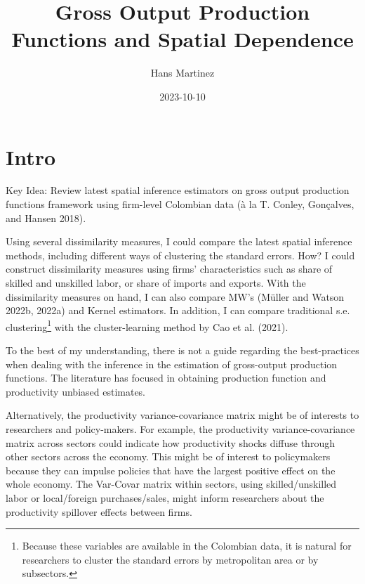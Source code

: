 \documentclass[
]{article}
\title{Gross Output Production Functions and Spatial Dependence}
\author{Hans Martinez}
\date{2023-10-10}
\begin{document}
\maketitle
\ifdefined\Shaded\renewenvironment{Shaded}{\begin{tcolorbox}[sharp corners, interior hidden, boxrule=0pt, enhanced, breakable, frame hidden, borderline west={3pt}{0pt}{shadecolor}]}{\end{tcolorbox}}\fi

\hypertarget{intro}{%
\section*{Intro}\label{intro}}

Key Idea: Review latest spatial inference estimators on gross output
production functions framework using firm-level Colombian data (à la T.
Conley, Gonçalves, and Hansen 2018).

Using several dissimilarity measures, I could compare the latest spatial
inference methods, including different ways of clustering the standard
errors. How? I could construct dissimilarity measures using firms'
characteristics such as share of skilled and unskilled labor, or share
of imports and exports. With the dissimilarity measures on hand, I can
also compare MW's (Müller and Watson 2022b, 2022a) and Kernel
estimators. In addition, I can compare traditional s.e.
clustering\footnote{Because these variables are available in the
  Colombian data, it is natural for researchers to cluster the standard
  errors by metropolitan area or by subsectors.} with the
cluster-learning method by Cao et al. (2021).

To the best of my understanding, there is not a guide regarding the
best-practices when dealing with the inference in the estimation of
gross-output production functions. The literature has focused in
obtaining production function and productivity unbiased estimates.

Alternatively, the productivity variance-covariance matrix might be of
interests to researchers and policy-makers. For example, the
productivity variance-covariance matrix across sectors could indicate
how productivity shocks diffuse through other sectors across the
economy. This might be of interest to policymakers because they can
impulse policies that have the largest positive effect on the whole
economy. The Var-Covar matrix within sectors, using skilled/unskilled
labor or local/foreign purchases/sales, might inform researchers about
the productivity spillover effects between firms.
\end{document}
